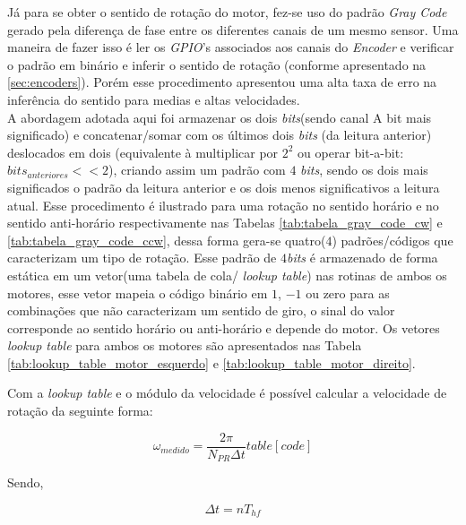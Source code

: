 Já para se obter o sentido de rotação do motor, fez-se uso do padrão \emph{Gray Code} gerado pela diferença de fase entre os diferentes canais de um mesmo sensor. Uma maneira de fazer isso é ler os \emph{GPIO}'s associados aos canais do \emph{Encoder} e verificar o padrão em binário e inferir o sentido de rotação (conforme apresentado na \autoref{sec:encoders}). Porém esse procedimento apresentou uma alta taxa de erro na inferência do sentido para medias e altas velocidades. \\

A abordagem adotada aqui foi armazenar os dois \emph{bits}(sendo canal A bit mais significado) e concatenar/somar com os últimos dois \emph{bits} (da leitura anterior) deslocados em dois (equivalente à multiplicar por $2^2$ ou operar bit-a-bit: $bits_{anteriores} << 2$), criando assim um padrão com $4$ \emph{bits}, sendo os dois mais significados o padrão da leitura anterior e os dois menos significativos a leitura atual. Esse procedimento é ilustrado para uma rotação no sentido horário e no sentido anti-horário respectivamente nas Tabelas \ref{tab:tabela_gray_code_cw} e \ref{tab:tabela_gray_code_ccw}, dessa forma gera-se quatro($4$) padrões/códigos que caracterizam um tipo de rotação. Esse padrão de $4$\emph{bits} é armazenado de forma estática em um vetor(uma tabela de cola/ \emph{lookup table}) nas rotinas de ambos os motores, esse vetor mapeia o código binário em $1$, $-1$ ou zero para as combinações que não caracterizam um sentido de giro, o sinal do valor corresponde ao sentido horário ou anti-horário e depende do motor. Os vetores \emph{lookup table} para ambos os motores são apresentados  nas Tabela \ref{tab:lookup_table_motor_esquerdo} e \ref{tab:lookup_table_motor_direito}.






Com a \emph{lookup table} e o módulo da velocidade é possível calcular a velocidade de rotação da seguinte forma:

\begin{equation}
    \omega_{medido} = \frac{2\pi}{N_{PR}\Delta{t}}table[code]
\end{equation}

Sendo,

\begin{equation*}
    \Delta{t} = nT_{hf}
\end{equation*}

